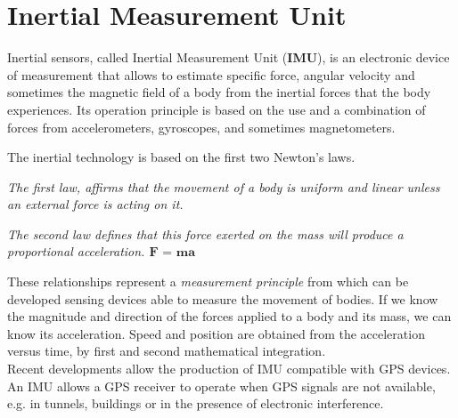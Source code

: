 \documentclass[tesi]{subfiles}
\begin{document}
\chapter{Inertial Measurement Unit}
\label{ch:Inertial Measurement Unit}
Inertial sensors, called Inertial Measurement Unit (\textbf{IMU}), is an electronic device of measurement that allows to estimate specific force, angular velocity and sometimes the magnetic field of a body from the inertial forces that the body experiences. Its operation principle is based on the use and a combination of forces from accelerometers, gyroscopes, and sometimes magnetometers.
\begin{center}
The inertial technology is based on the first two Newton’s laws. 

 \textit{The first law, affirms that the movement of a body is uniform and linear unless an external force is acting on it.} 

 \textit{The second law defines that this force exerted on the mass will produce a proportional acceleration. $ \textbf{F = ma} $
} 
\end{center} 

\noindent These relationships represent a \textit{measurement principle} from which can be developed sensing devices  able to measure the movement of bodies.
If we know the magnitude and direction of the forces applied to a body and its mass, we can know its acceleration. Speed and position are obtained from the acceleration versus time, by first and second mathematical integration.\\
Recent developments allow the production of IMU compatible with GPS devices. An IMU allows a GPS receiver to operate when GPS signals are not available, e.g. in tunnels, buildings or in the presence of electronic interference\cite{gpssystem}.
\newpage
\end{document}
